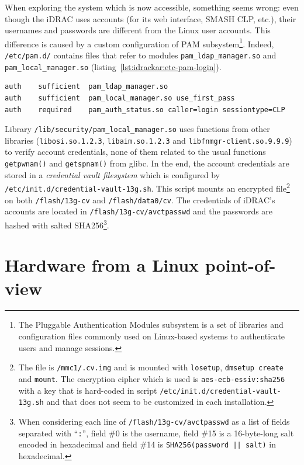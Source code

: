 When exploring the system which is now accessible, something seems wrong: even though the iDRAC uses accounts (for its web interface, SMASH CLP, etc.), their usernames and passwords are different from the Linux user accounts.
This difference is caused by a custom configuration of PAM subsystem\footnote{The Pluggable Authentication Modules subsystem is a set of libraries and configuration files commonly used on Linux-based systems to authenticate users and manage sessions.}.
Indeed, \texttt{/etc/pam.d/} contains files that refer to modules \texttt{pam\_ldap\_manager.so} and \texttt{pam\_local\_manager.so} (listing~\ref{lst:idrackar:etc-pam-login}).

\begin{lstlisting}[language={},caption={extract from \texttt{/etc/pam.d/login} in iDRAC 8.},label={lst:idrackar:etc-pam-login}]
auth    sufficient  pam_ldap_manager.so
auth    sufficient  pam_local_manager.so use_first_pass
auth    required    pam_auth_status.so caller=login sessiontype=CLP
\end{lstlisting}

Library \texttt{/lib/security/pam\_local\_manager.so} uses functions from other libraries (\texttt{libosi.so.1.2.3}, \texttt{libaim.so.1.2.3} and \texttt{libfnmgr-client.so.9.9.9}) to verify account credentials, none of them related to the usual functions \texttt{getpwnam()} and \texttt{getspnam()} from glibc.
In the end, the account credentials are stored in a \emph{credential vault filesystem} which is configured by \texttt{/etc/init.d/credential-vault-13g.sh}.
This script mounts an encrypted file\footnote{The file is \texttt{/mmc1/.cv.img} and is mounted with \texttt{losetup}, \texttt{dmsetup create} and \texttt{mount}. The encryption cipher which is used is \texttt{aes-ecb-essiv:sha256} with a key that is hard-coded in script \texttt{/etc/init.d/credential-vault-13g.sh} and that does not seem to be customized in each installation.} on both \texttt{/flash/13g-cv} and \texttt{/flash/data0/cv}.
The credentials of iDRAC's accounts are located in \texttt{/flash/13g-cv/avctpasswd} and the passwords are hashed with salted SHA256\footnote{When considering each line of \texttt{/flash/13g-cv/avctpasswd} as a list of fields separated with ``\texttt{:}'', field \#0 is the username, field \#15 is a 16-byte-long salt encoded in hexadecimal and field \#14 is \texttt{SHA256(password || salt)} in hexadecimal.}.

\section{Hardware from a Linux point-of-view}
\label{sect:idrackar:hardware}

